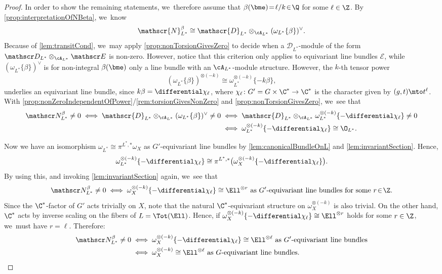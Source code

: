 \begin{proof}
In order to show the remaining statements, we~therefore assume that \hbox{$\beta(\bme) \!=\! \ell/k \!\in\! \Q$} for some $\ell\in\Z$. By \cref{prop:interpretationOfNBeta}, we~know
\[
\mathscr{N}_{L^*}^{\beta} \cong \mathscr{D}_{L^*} \otimes_{\cA_{L^*}} (\omega_{L^*}\{\beta\})^\vee.
\]
Because of \cref{lem:transitCond}, we~may apply \cref{prop:nonTorsionGivesZero} to decide when a $\mathscr D_{L^*}$\nobreakdash-mod\-ule of the form ${\mathscr D_{L^*} \otimes_{\cA_{L^*}} \mathscr E}$ is non-zero. However, notice that this criterion only applies to equivariant line bundles $\mathscr E$, while $(\omega_{L^*}\{\beta\})^\vee$ is for non-integral $\beta(\bme)$ only a line bundle with an $\cA_{L^*}$\nobreakdash-mod\-ule structure. However, the $k$-th tensor power
\[
(\omega_{L^*}\{\beta\})^{\otimes (-k)} \cong \omega_{L^*}^{\otimes (-k)}\{-k\beta\},
\]
underlies an equivariant line bundle, since $k\beta =\differential\chi_{\ell}$, where \hbox{$\chi_{\ell} \colon G'=G \times \C^* \to \C^*$} is the character given by $(g,t) \mto t^{\ell}$. With \cref{prop:nonZeroIndependentOfPower}/\cref{rem:torsionGivesNonZero} and \cref{prop:nonTorsionGivesZero}, we~see that
\begin{align*}
\mathscr N_{L^*}^\beta \neq 0 \iff\mathscr{D}_{L^*} \otimes_{\cA_{L^*}} (\omega_{L^*}\{\beta\})^\vee \neq 0
&\iff \mathscr{D}_{L^*} \otimes_{\cA_{L^*}} \omega_{L^*}^{\otimes (-k)}\{-\differential\chi_\ell\} \neq 0 \\
&\iff\omega_{L^*}^{\otimes (-k)}\{-\differential\chi_\ell\} \cong \O_{L^*}.
\end{align*}

Now we have an isomorphism $\omega_{L^*} \cong \pi^{L^*,*} \omega_X$ as $G'$-equivariant line bundles by \cref{lem:canonicalBundleOnL} and \cref{lem:invariantSection}. Hence,
\[
\omega_{L^*}^{\otimes (-k)}\{-\differential\chi_\ell\} \cong \pi^{L^*,*} \big(\omega_X^{\otimes (-k)}\{-\differential\chi_\ell\}\big).
\]
By using this, and invoking \cref{lem:invariantSection} again, we~see that
\[
\mathscr N_{L^*}^\beta \neq 0 \iff \omega_X^{\otimes (-k)}\{-\differential\chi_\ell\} \cong \Ell^{\otimes r} \text{ as $G'$-equivariant line bundles for some $r\!\in\! \Z$}.
\]
Since the $\C^*$-factor of $G'$ acts trivially on $X$, note that the natural $\C^*$-equivariant structure on $\omega_X^{\otimes (-k)}$ is also trivial. On the other hand, $\C^*$ acts by inverse scaling on the fibers of $L = \Tot(\Ell)$. Hence, if $\omega_X^{\otimes (-k)}\{-\differential\chi_\ell\} \cong \Ell^{\otimes r}$ holds for some $r \in \Z$, we~must have $r = \ell$. Therefore:
\begin{align*}
\mathscr N_{L^*}^\beta \neq 0 &\iff\omega_X^{\otimes (-k)}\{-\differential\chi_\ell\} \cong \Ell^{\otimes \ell} \text{ as $G'$-equivariant line bundles} \\
&\iff \omega_X^{\otimes (-k)} \cong \Ell^{\otimes \ell} \text{ as $G$-equivariant line bundles}. \qedhere
\end{align*}
\end{proof}

